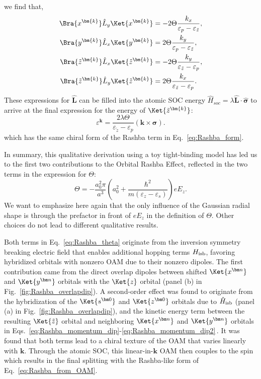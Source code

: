 we find that,
\begin{align}
	\label{eq:oam_from_k}
	\Bra{x^{\bm{k}}} \hat{L}_y \Ket{x^{\bm{k}}} &= -2 \Theta \frac{k_x}{\varepsilon_p - \varepsilon_{\tilde{z}}},\\
	\Bra{y^{\bm{k}}} \hat{L}_x \Ket{y^{\bm{k}}} &= 2 \Theta \frac{k_y}{\varepsilon_p - \varepsilon_{\tilde{z}}},\\
	\Bra{\tilde{z}^{\bm{k}}} \hat{L}_x \Ket{\tilde{z}^{\bm{k}}} &= - 2 \Theta \frac{k_y}{\varepsilon_{\tilde{z}} - \varepsilon_p},\\ 
	\Bra{\tilde{z}^{\bm{k}}} \hat{L}_y \Ket{\tilde{z}^{\bm{k}}} &= 2 \Theta \frac{k_x}{\varepsilon_{\tilde{z}}-\varepsilon_p}\label{eq:oam_from_k_final}.
\end{align}
These expressions for $\hat{\bm{L}}$ can be filled into the atomic SOC energy $\hat{H}_{soc}= \lambda \hat{\bm{L}} \cdot \hat{\bm{\sigma}}$ to arrive at the final expression for the energy of $\Ket{\tilde{z}^{\bm{k}}}$:
\begin{equation}
	\label{eq:Rashba_from_OAM}
	\varepsilon^{\bm{k}} = \frac{2 \lambda \Theta}{\varepsilon_{\tilde{z}}-\varepsilon_p}(\bm{k} \times \bm{\sigma}).
\end{equation}
which has the same chiral form of the Rashba term in Eq.~\eqref{eq:Rashba_form}.
    
In summary, this qualitative derivation using a toy tight-binding model has led us to the first two contributions to the Orbital Rashba Effect, reflected in the two terms in the expression for $\Theta$:
\begin{equation}
	\label{eq:Rashba_theta}
\Theta = -\frac{a_0^2 \pi}{a^3}\left(a_0^2 + \frac{\hbar^2}{m(\varepsilon_z - \varepsilon_s)}\right) e E_z.
\end{equation}
We want to emphasize here again that the only influence of the Gaussian radial shape is through the prefactor in front of $e E_z$ in the definition of $\Theta$.
Other choices do not lead to different qualitative results.

Both terms in Eq.~\eqref{eq:Rashba_theta} originate from the inversion symmetry breaking electric field that enables additional hopping terms $H_{\rm isb}$, favoring hybridized orbitals with nonzero OAM due to their nonzero dipoles. 
The first contribution came from the direct overlap dipoles between shifted $\Ket{x^{\bm n}}$ and $\Ket{y^{\bm n}}$ orbitals with the $\Ket{z}$ orbital (panel (b) in Fig.~\ref{fig:Rashba_overlapdip})\cite{Petersen2000}.
A second-order effect was found to originate from the hybridization of the $\Ket{s^{\bm 0}}$ and $\Ket{z^{\bm 0}}$ orbitals due to $\hat H_{\rm isb}$ (panel (a) in Fig.~\ref{fig:Rashba_overlapdip}), and the kinetic energy term between the resulting $\Ket{\tilde z}$ orbital and neighboring $\Ket{x^{\bm n}}$ and $\Ket{y^{\bm n}}$ orbitals in Eqs.~\eqref{eq:Rashba_momentum_dip}-\eqref{eq:Rashba_momentum_dip2}\,\cite{Go2016}.
It was found that both terms lead to a chiral texture of the OAM that varies linearly with $\bm k$.
Through the atomic SOC, this linear-in-$\bm k$ OAM then couples to the spin which results in the final splitting with the Rashba-like form of Eq.~\eqref{eq:Rashba_from_OAM}.
    
